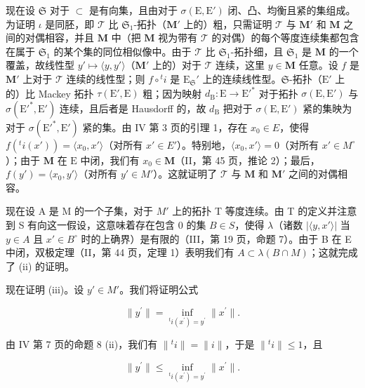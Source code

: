 现在设 \(\mathfrak{S}\) 对于 \(\subset\) 是有向集，且由对于 \(\sigma(\mathrm{E},\mathrm{E}')\) 闭、凸、均衡且紧的集组成。为证明 \(\iota\) 是同胚，即 \(\mathcal{T}\) 比 \(\mathfrak{S}_1\)-拓扑（\(\mathbf{M}'\) 上的）粗，只需证明 \(\mathcal{T}\) 与 \(\mathbf{M}'\) 和 \(\mathbf{M}\) 之间的对偶相容，并且 \(\mathbf{M}\) 中（把 \(\mathbf{M}\) 视为带有 \(\mathcal{T}\) 的对偶）的每个等度连续集都包含在属于 \(\mathfrak{S}_1\) 的某个集的同位相似像中。由于 \(\mathcal{T}\) 比 \(\mathfrak{S}_1\)-拓扑细，且 \(\mathfrak{S}_1\) 是 \(\mathbf{M}\) 的一个覆盖，故线性型 \(y' \mapsto \langle y, y' \rangle\)（\(\mathbf{M}'\) 上的）对于 \(\mathcal{T}\) 连续，这里 \(y \in \mathbf{M}\) 任意。设 \(f\) 是 \(\mathbf{M}'\) 上对于 \(\mathcal{T}\) 连续的线性型；则 \(f \circ {}^t i\) 是 \(\mathrm{E}_{\mathfrak{S}}'\) 上的连续线性型。\(\mathfrak{S}\)-拓扑（\(\mathrm{E}'\) 上的）比 Mackey 拓扑 \(\tau(\mathrm{E}',\mathrm{E})\) 粗；因为映射 \(d_{\mathrm{B}}: \mathrm{E} \to \mathrm{E}'^*\) 对于拓扑 \(\sigma(\mathrm{E},\mathrm{E}')\) 与 \(\sigma(\mathrm{E}'^*,\mathrm{E}')\) 连续，且后者是 Hausdorff 的，故 \(d_{\mathrm{B}}\) 把对于 \(\sigma(\mathrm{E},\mathrm{E}')\) 紧的集映为对于 \(\sigma(\mathrm{E}'^*,\mathrm{E}')\) 紧的集。由 IV 第 3 页的引理 1，存在 \(x_0 \in E\)，使得 \(f(^t i(x')) = \langle x_0, x' \rangle\)（对所有 \(x' \in E'\)）。特别地，\(\langle x_0, x' \rangle = 0\)（对所有 \(x' \in M^\circ\)）；由于 \(\mathbf{M}\) 在 \(\mathrm{E}\) 中闭，我们有 \(x_0 \in \mathbf{M}\)（II，第 45 页，推论 2）；最后，\(f(y') = \langle x_0, y' \rangle\)（对所有 \(y' \in M'\)）。这就证明了 \(\mathcal{T}\) 与 \(\mathbf{M}\) 和 \(\mathbf{M}'\) 之间的对偶相容。

现在设 A 是 M 的一个子集，对于 \(M'\) 上的拓扑 T 等度连续。由 T 的定义并注意到 S 有向这一假设，这意味着存在包含 0 的集 \(B \in S\)，使得 \(\lambda\)（诸数 \(\left|\langle y, x'\rangle\right|\) 当 \(y \in A\) 且 \(x' \in B^{\circ}\) 时的上确界）是有限的（III，第 19 页，命题 7）。由于 B 在 E 中闭，双极定理（II，第 44 页，定理 1）表明我们有 \(A \subset \lambda(B \cap M)\)；这就完成了 (ii) 的证明。

现在证明 (iii)。设 \(y' \in M'\)。我们将证明公式

\[
\| y ^ {\prime} \| = \inf _ {{}^t i (x ^ {\prime}) = y ^ {\prime}} \| x ^ {\prime} \|.\tag{6}
\]

由 IV 第 7 页的命题 8 (ii)，我们有 \(\| {}^t i\| = \| i\|\)，于是 \(\| {}^t i\| \leqslant 1\)，且

\[
\| y ^ {\prime} \| \leqslant \inf _ {{}^t i (x ^ {\prime}) = y ^ {\prime}} \| x ^ {\prime} \|.\tag{7}
\]

